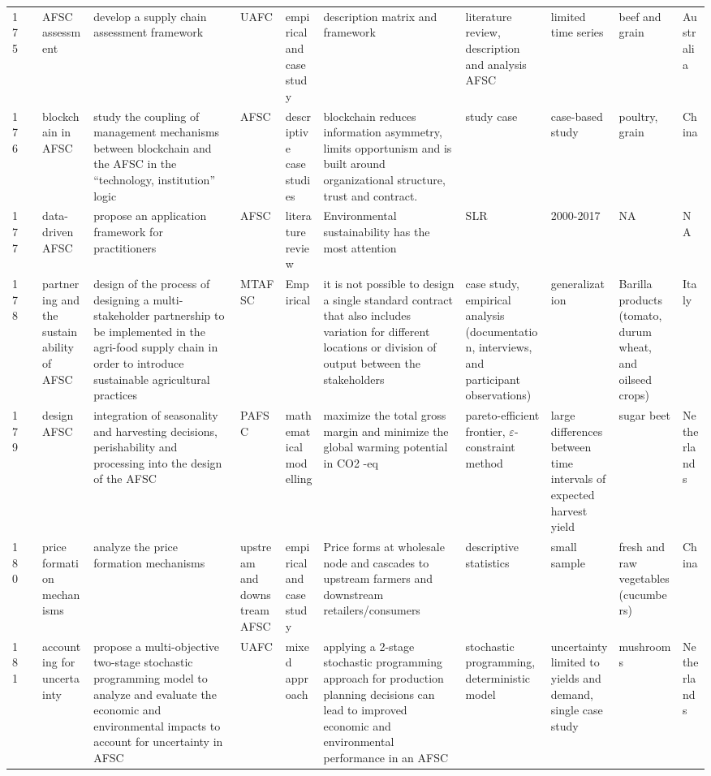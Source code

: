 \documentclass[a4paper,10pt]{article}
\begin{document}
\begin{landscape}
\begin{small}
\begin{longtable}{p{0.5cm} p{2cm} p{2.5cm} p{4cm} p{1cm} p{2.5cm} p{5.5cm} p{2.5cm} p{2.5cm} p{1.8cm} p{1.5cm}}
175 & \textcite{Schrobback177} &AFSC assessment & develop a supply chain assessment framework&UAFC & empirical and case study& description matrix and framework& literature review, description and analysis AFSC & limited time series& beef and grain& Australia  \\
176 & \textcite{Fu178} &blockchain in AFSC & study the coupling of management mechanisms between blockchain and the AFSC in the “technology, institution” logic&AFSC &descriptive case studies& blockchain reduces information asymmetry, limits opportunism and is built around organizational structure, trust and contract. &study case  & case-based study&poultry, grain& China  \\
177 & \textcite{Kamble} &data-driven AFSC & propose an application framework for practitioners&AFSC &literature review& Environmental sustainability has the most attention &SLR  & 2000-2017&NA& NA  \\
178 & \textcite{Pancino179} &partnering and the sustainability of AFSC & design of  the process of designing a multi-stakeholder partnership to be implemented in the agri-food supply chain in order to introduce sustainable agricultural practices&MTAFSC & Empirical& it is not possible to design a single standard contract that also includes variation for different locations or division of output between the stakeholders &case study, empirical analysis (documentation, interviews, and participant observations)  & generalization& Barilla products (tomato, durum wheat, and oilseed crops)& Italy  \\
179 & \textcite{Jonkman180} &design AFSC  & integration of seasonality and harvesting decisions, perishability and processing into the design of the AFSC &PAFSC & mathematical modelling& maximize the total gross margin and minimize the global warming potential in CO2 -eq &pareto-efficient frontier, $\varepsilon$-constraint method   &  large differences between time intervals of expected harvest yield& sugar beet& Netherlands  \\
180& \textcite{Cao181} &price formation mechanisms & analyze the price formation mechanisms&upstream
and downstream AFSC & empirical and case study& Price forms at wholesale node and cascades to upstream farmers and downstream retailers/consumers&descriptive statistics   & small sample& fresh and raw vegetables (cucumbers)& China  \\
181 & \textcite{Banasik182} &accounting for uncertainty & propose a multi-objective two-stage stochastic programming model to analyze and evaluate the economic and environmental impacts to account for uncertainty in AFSC&UAFC & mixed approach& applying a 2-stage stochastic programming approach for production planning decisions can lead to improved economic and environmental performance in an AFSC & stochastic programming, deterministic model   & uncertainty limited to yields and demand, single case study&  mushrooms & Netherlands \\

\end{longtable}
\end{small}
\end{landscape}
\end{document}
